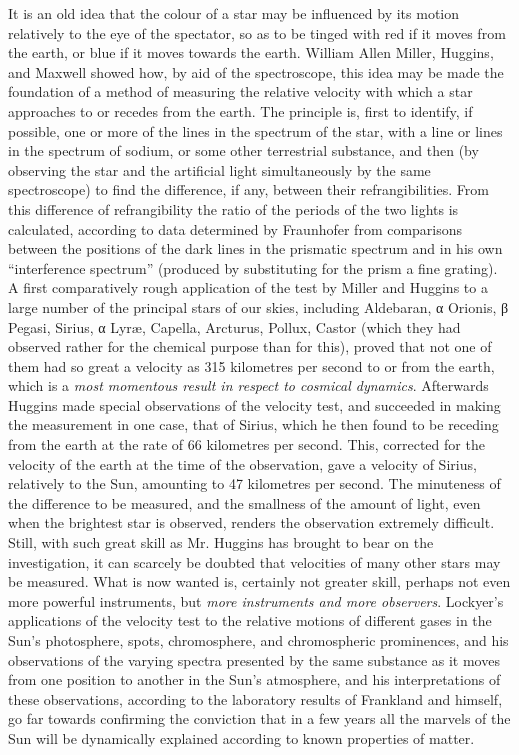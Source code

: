 \documentclass[a4paper, 11pt, oneside, english]{article}
\begin{document}
It is an old idea that the colour of a star may be influenced by its motion relatively to the eye of the spectator, so as to be tinged with red if it moves from the earth, or blue if it moves towards the earth. William Allen Miller, Huggins, and Maxwell showed how, by aid of the spectroscope, this idea may be made the foundation of a method of measuring the relative velocity with which a star approaches to or recedes from the earth. The principle is, first to identify, if possible, one or more of the lines in the spectrum of the star, with a line or lines in the spectrum of sodium, or some other terrestrial substance, and then (by observing the star and the artificial light simultaneously by the same spectroscope) to find the difference, if any, between their refrangibilities. From this difference of refrangibility the ratio of the periods of the two lights is calculated, according to data determined by Fraunhofer from comparisons between the positions of the dark lines in the prismatic spectrum and in his own ``interference spectrum'' (produced by substituting for the prism a fine grating). A first comparatively rough application of the test by Miller and Huggins to a large number of the principal stars of our skies, including Aldebaran, α Orionis, β Pegasi, Sirius, α Lyræ, Capella, Arcturus, Pollux, Castor (which they had observed rather for the chemical purpose than for this), proved that not one of them had so great a velocity as 315 kilometres per second to or from the earth, which is a \emph{most momentous result in respect to cosmical dynamics}. Afterwards Huggins made special observations of the velocity test, and succeeded in making the measurement in one case, that of Sirius, which he then found to be receding from the earth at the rate of 66 kilometres per second. This, corrected for the velocity of the earth at the time of the observation, gave a velocity of Sirius, relatively to the Sun, amounting to 47 kilometres per second. The minuteness of the difference to be measured, and the smallness of the amount of light, even when the brightest star is observed, renders the observation extremely difficult. Still, with such great skill as Mr. Huggins has brought to bear on the investigation, it can scarcely be doubted that velocities of many other stars may be measured. What is now wanted is, certainly not greater skill, perhaps not even more powerful instruments, but \emph{more instruments and more observers}. Lockyer's applications of the velocity test to the relative motions of different gases in the Sun's photosphere, spots, chromosphere, and chromospheric prominences, and his observations of the varying spectra presented by the same substance as it moves from one position to another in the Sun's atmosphere, and his interpretations of these observations, according to the laboratory results of Frankland and himself, go far towards confirming the conviction that in a few years all the marvels of the Sun will be dynamically explained according to known properties of matter.
\end{document}
